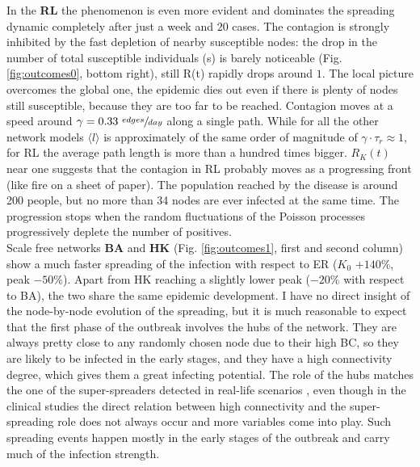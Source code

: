 \documentclass[DIV=12, BCOR=0pt]{scrartcl}  %
\begin{document}
  In the \textbf{RL} the phenomenon is even more evident and dominates the spreading dynamic completely after just a week and $20$ cases. The contagion is strongly inhibited by the fast depletion of nearby susceptible nodes: the drop in the number of total susceptible individuals (s) is barely noticeable (Fig. \ref{fig:outcomes0}, bottom right), still R(t) rapidly drops around $1$. The local picture overcomes the global one, the epidemic dies out even if there is plenty of nodes still susceptible, because they are too far to be reached. Contagion moves at a speed around $\gamma = 0.33 \ \sfrac{edges}{day}$ along a single path. While for all the other network models $\langle l \rangle $ is approximately of the same order of magnitude of $\gamma \cdot \tau_r \approx 1 $, for RL the average path length is more than a hundred times bigger.
  $R_K(t)$ near one suggests that the contagion in RL probably moves as a progressing front (like fire on a sheet of paper). The population reached by the disease is around 200 people, but no more than 34 nodes are ever infected at the same time. The progression stops when the random fluctuations of the Poisson processes progressively deplete the number of positives.\\
  
  Scale free networks \textbf{BA} and \textbf{HK} (Fig. \ref{fig:outcomes1}, first and second column) show a much faster spreading of the infection with respect to ER ($K_0$ $+ 140 \%$, peak $- 50 \%$). Apart from HK reaching a slightly lower peak ($- 20 \%$ with respect to BA), the two share the same epidemic development.
  I have no direct insight of the node-by-node evolution of the spreading, but it is much reasonable to expect that the first phase of the outbreak involves the hubs of the network. They are always pretty close to any randomly chosen node due to their high BC, so they are likely to be infected in the early stages, and they have a high connectivity degree, which gives them a great infecting potential. The role of the hubs matches the one of the super-spreaders detected in real-life scenarios \citep{Kissler2018}, even though in the clinical studies the direct relation between high connectivity and the super-spreading role does not always occur and more variables come into play. %
  Such spreading events happen mostly in the early stages of the outbreak and carry much of the infection strength.
  
\end{document}
